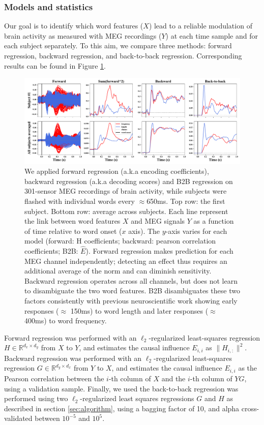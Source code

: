 \subsubsection{Models and statistics}

Our goal is to identify which word features ($X$) lead to a reliable modulation of brain activity as measured with MEG recordings ($Y$) at each time sample and for each subject separately. To this aim,
we compare three methods: forward regression, backward regression, and back-to-back regression.
Corresponding results can be found in Figure \ref{fig:meg_twocurves}.

\begin{figure}[t!]
  \centering
  \includegraphics[width=\textwidth, trim=0cm 0cm 0cm 0cm, clip=True]{figures/meg_twocurves.pdf}
  \caption{We applied forward regression (a.k.a encoding coefficients), backward regression (a.k.a decoding scores) and B2B regression on 301-sensor MEG recordings of brain activity, while subjects were flashed with individual words every $\approx$650ms. Top row: the first subject. Bottom row: average across subjects. Each line represent the link between word features $X$ and MEG signals $Y$
  as a function of time relative to word onset ($x$ axis). The $y$-axis varies for each model (forward: H coefficients; backward: pearson correlation coefficients; B2B: $\hat E$). Forward regression makes prediction for each MEG channel independently; detecting an effect thus requires an additional average of the norm and can diminish sensitivity. Backward regression operates across all channels, but does not learn to disambiguate the two word features. B2B disambiguates these two factors consistently with previous neuroscientific work \cite{kutas2011thirty}\citep{pegado2014timing}
  showing early responses ($\approx$ 150ms) to word length and later responses
  ($\approx$ 400ms) to word frequency.}
  \label{fig:meg_twocurves}
\end{figure}

Forward regression was performed with an $\ell_2$-regularized least-squares regression $H \in \mathbb{R}^{d_x \times d_y}$ from $X$ to $Y$, and estimates the causal influence $E_{i,i}$ as $\| H_{i, :} \|^2$.
Backward regression was performed with an $\ell_2$-regularized least-squares regression $G \in \mathbb{R}^{d_y \times d_x}$ from $Y$ to $X$, and estimates the causal influence $E_{i, i}$ as the Pearson correlation between the $i$-th column of $X$ and the $i$-th column of $YG$, using a validation sample. Finally, we used the back-to-back regression was performed using two $\ell_2$-regularized
least squares regressions $G$ and $H$ as described in section \ref{sec:algorithm}, using a bagging factor of 10, and alpha cross-validated between $10^{-5}$ and $10^{5}$.

